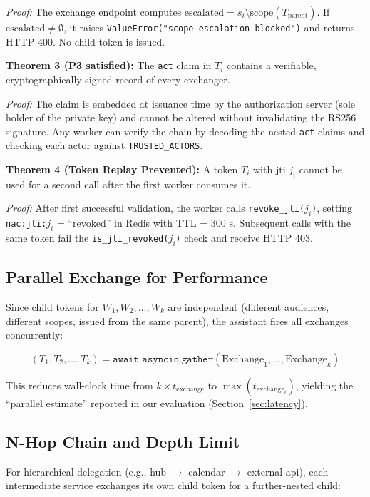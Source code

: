 \documentclass[journal]{IEEEtran}
\begin{document}
\textit{Proof:} The exchange endpoint computes $\text{escalated} = s_i \setminus \text{scope}(T_{\text{parent}})$. If $\text{escalated} \neq \emptyset$, it raises \texttt{ValueError("scope escalation blocked")} and returns HTTP 400. No child token is issued.

\textbf{Theorem 3 (P3 satisfied):} The \texttt{act} claim in $T_i$ contains a verifiable, cryptographically signed record of every exchanger.

\textit{Proof:} The claim is embedded at issuance time by the authorization server (sole holder of the private key) and cannot be altered without invalidating the RS256 signature. Any worker can verify the chain by decoding the nested \texttt{act} claims and checking each actor against \texttt{TRUSTED\_ACTORS}.

\textbf{Theorem 4 (Token Replay Prevented):} A token $T_i$ with jti $j_i$ cannot be used for a second call after the first worker consumes it.

\textit{Proof:} After first successful validation, the worker calls \texttt{revoke\_jti($j_i$)}, setting \texttt{nac:jti:$j_i$} = ``revoked'' in Redis with TTL = 300 s. Subsequent calls with the same token fail the \texttt{is\_jti\_revoked($j_i$)} check and receive HTTP 403.

\subsection{Parallel Exchange for Performance}

Since child tokens for $W_1, W_2, \ldots, W_k$ are independent (different audiences, different scopes, issued from the same parent), the assistant fires all exchanges concurrently:

\begin{equation}
(T_1, T_2, \ldots, T_k) = \texttt{await asyncio.gather}(\text{Exchange}_1, \ldots, \text{Exchange}_k)
\label{eq:parallel}
\end{equation}

This reduces wall-clock time from $k \times t_{\text{exchange}}$ to $\max(t_{\text{exchange}_i})$, yielding the ``parallel estimate'' reported in our evaluation (Section~\ref{sec:latency}).

\subsection{N-Hop Chain and Depth Limit}

For hierarchical delegation (e.g., hub $\to$ calendar $\to$ external-api), each intermediate service exchanges its own child token for a further-nested child:
\end{document}
